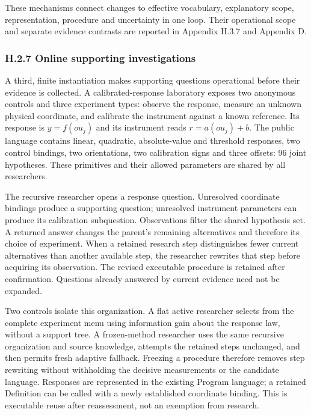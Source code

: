 \documentclass[twoside,11pt]{article}
\begin{document}
These mechanisms connect changes to effective vocabulary, explanatory scope,
representation, procedure and uncertainty in one loop. Their operational scope
and separate evidence contrasts are reported in Appendix H.3.7 and Appendix D.


\subsubsection*{H.2.7 Online supporting investigations}

A third, finite instantiation makes supporting questions operational before
their evidence is collected. A calibrated-response laboratory exposes two
anonymous controls and three experiment types: observe the response, measure
an unknown physical coordinate, and calibrate the instrument against a known
reference. Its response is \(y=f(o u_j)\) and its instrument reads
\(r=a(o u_j)+b\). The public language contains linear, quadratic, absolute-value
and threshold responses, two control bindings, two orientations, two calibration
signs and three offsets: 96 joint hypotheses. These primitives and their allowed
parameters are shared by all researchers.


The recursive researcher opens a response question. Unresolved coordinate
bindings produce a supporting question; unresolved instrument parameters can
produce its calibration subquestion. Observations filter the shared hypothesis
set. A returned answer changes the parent's remaining alternatives and therefore
its choice of experiment. When a retained research step distinguishes fewer
current alternatives than another available step, the researcher rewrites that
step before acquiring its observation. The revised executable procedure is
retained after confirmation. Questions already answered by current evidence need
not be expanded.


Two controls isolate this organization. A flat active researcher selects from
the complete experiment menu using information gain about the response law,
without a support tree. A frozen-method researcher uses the same recursive
organization and source knowledge, attempts the retained steps unchanged, and
then permits fresh adaptive fallback. Freezing a procedure therefore removes
step rewriting without withholding the decisive measurements or the candidate
language. Responses are represented in the existing Program language; a
retained Definition can be called with a newly established coordinate binding.
This is executable reuse after reassessment, not an exemption from research.
\end{document}
